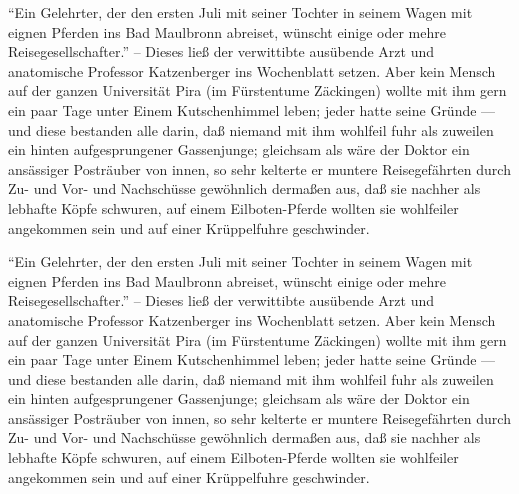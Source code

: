 \documentclass[11pt]{book}
\begin{document}
\begin{pages}
\beginnumbering
\begin{Leftside}
\pstart
``Ein Gelehrter, der den ersten Juli mit seiner Tochter in seinem Wagen mit eignen Pferden ins Bad Maulbronn abreiset, wünscht einige oder mehre Reisegesellschafter.'' -- Dieses ließ der verwittibte ausübende Arzt und anatomische Professor Katzenberger ins Wochenblatt setzen. Aber kein Mensch auf der ganzen Universität Pira (im Fürstentume Zäckingen) wollte mit ihm gern ein paar Tage unter Einem Kutschenhimmel leben; jeder hatte seine Gründe --- und diese bestanden alle darin, daß niemand mit ihm wohlfeil fuhr als zuweilen ein hinten aufgesprungener Gassenjunge; gleichsam als wäre der Doktor ein ansässiger Posträuber von innen, so sehr kelterte er muntere Reisegefährten durch Zu- und Vor- und Nachschüsse gewöhnlich dermaßen aus, daß sie nachher als lebhafte Köpfe schwuren, auf einem Eilboten-Pferde wollten sie wohlfeiler angekommen sein und auf einer Krüppelfuhre geschwinder.
\pend
\endnumbering
\end{Leftside}
\begin{Rightside}
\beginnumbering
\pstart
``Ein Gelehrter, der den ersten Juli mit seiner Tochter in seinem Wagen mit eignen Pferden ins Bad Maulbronn abreiset, wünscht einige oder mehre Reisegesellschafter.'' -- Dieses ließ der verwittibte ausübende Arzt und anatomische Professor Katzenberger ins Wochenblatt setzen. Aber kein Mensch auf der ganzen Universität Pira (im Fürstentume Zäckingen) wollte mit ihm gern ein paar Tage unter Einem Kutschenhimmel leben; jeder hatte seine Gründe --- und diese bestanden alle darin, daß niemand mit ihm wohlfeil fuhr als zuweilen ein hinten aufgesprungener Gassenjunge; gleichsam als wäre der Doktor ein ansässiger Posträuber von innen, so sehr kelterte er muntere Reisegefährten durch Zu- und Vor- und Nachschüsse gewöhnlich dermaßen aus, daß sie nachher als lebhafte Köpfe schwuren, auf einem Eilboten-Pferde wollten sie wohlfeiler angekommen sein und auf einer Krüppelfuhre geschwinder.
\pend
\endnumbering
\end{Rightside}
\Pages
\end{pages}
\end{document}
